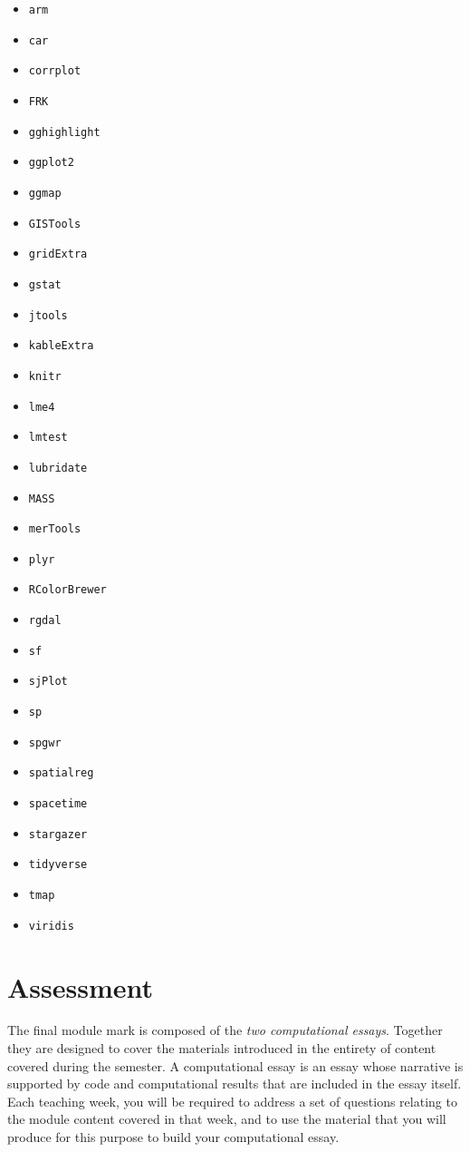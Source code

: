 \documentclass[
]{book}
\providecommand{\tightlist}{%
  \setlength{\itemsep}{0pt}\setlength{\parskip}{0pt}}
\begin{document}
\begin{itemize}
\tightlist
\item
  \texttt{arm}
\item
  \texttt{car}
\item
  \texttt{corrplot}
\item
  \texttt{FRK}
\item
  \texttt{gghighlight}
\item
  \texttt{ggplot2}
\item
  \texttt{ggmap}
\item
  \texttt{GISTools}
\item
  \texttt{gridExtra}
\item
  \texttt{gstat}
\item
  \texttt{jtools}
\item
  \texttt{kableExtra}
\item
  \texttt{knitr}
\item
  \texttt{lme4}
\item
  \texttt{lmtest}
\item
  \texttt{lubridate}
\item
  \texttt{MASS}
\item
  \texttt{merTools}
\item
  \texttt{plyr}
\item
  \texttt{RColorBrewer}
\item
  \texttt{rgdal}
\item
  \texttt{sf}
\item
  \texttt{sjPlot}
\item
  \texttt{sp}
\item
  \texttt{spgwr}
\item
  \texttt{spatialreg}
\item
  \texttt{spacetime}
\item
  \texttt{stargazer}
\item
  \texttt{tidyverse}
\item
  \texttt{tmap}
\item
  \texttt{viridis}
\end{itemize}

\hypertarget{assessment}{%
\section{Assessment}\label{assessment}}

The final module mark is composed of the \emph{two computational essays}. Together they are designed to cover the materials introduced in the entirety of content covered during the semester. A computational essay is an essay whose narrative is supported by code and computational results that are included in the essay itself. Each teaching week, you will be required to address a set of questions relating to the module content covered in that week, and to use the material that you will produce for this purpose to build your computational essay.
\end{document}
